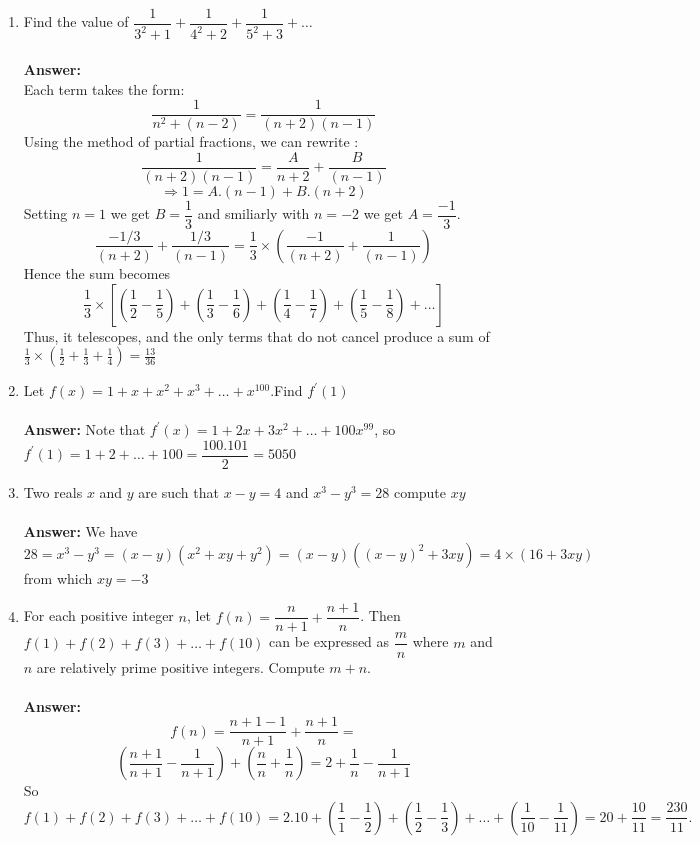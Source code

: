 \documentclass[a4paper]{article}
\begin{document}
\begin{enumerate}
    \item  Find the value of $\dfrac{1}{3^2+1}+
        \dfrac{1}{4^2+2}+\dfrac{1}{5^2+3} + \dots$
        \\ \\
        \textbf{Answer:} \\
        Each term takes the form:
        $$ \dfrac{1}{n^2 + (n-2)} = \dfrac{1}{(n+2)(n-1)}$$
        Using the method of partial fractions, we can rewrite :
        $$ \dfrac{1}{(n+2)(n-1)} = \dfrac{A}{n+2} + \dfrac{B}{(n-1)}$$
        $$ \Rightarrow 1 = A.(n-1) + B.(n+2)$$
        Setting $n=1$ we get $B=\dfrac{1}{3}$ and smiliarly with $n=-2$ we 
        get $A=\dfrac{-1}{3}$. 
        \[
            \dfrac{-1/3}{(n+2)} + \dfrac{1/3}{(n-1)} = \dfrac{1}{3} \times (\dfrac{-1}{(n+2)} + \dfrac{1}{(n-1)})
        \] Hence the sum becomes
        \[
           \displaystyle \frac{1}{3} \times [(\frac{1}{2}-\frac{1}{5}) + (\frac{1}{3}-\frac{1}{6})
           +(\frac{1}{4}-\frac{1}{7}) + (\frac{1}{5} - \frac{1}{8})+  \dots]
        \]
        Thus, it telescopes, and the only terms that do not cancel produce a sum of $\frac{1}{3} \times
        (\frac{1}{2} + \frac{1}{3} + \frac{1}{4}) = \frac{13}{36}$
    \item Let $f(x) = 1 + x + x^2 + x^3 + \dots+ x^{100}$.Find $f^\prime(1)$
        \\ \\
        \textbf{Answer:}
        Note that $f^\prime(x) = 1 + 2x + 3x^2 + \dots + 100x^{99}
        $, so $f^\prime(1) = 1+2+\dots+100 = \dfrac{100.101}{2} = 5050$
    \item Two reals $x$ and $y$ are such that $x - y = 4$ and $x^3 - y^3 = 28$ compute $xy$ 
        \\ \\
        \textbf{Answer:}
        We have $$28 = x^3 -y^3 = (x-y)(x^2 + xy + y^2) = (x-y)((x-y)^2 + 3xy) = 4 \times(16 + 3xy)$$
        from which $xy = -3$
    \item  For each positive integer $n$, let $f(n) = \dfrac{n}{n+1} + \dfrac{n+1}{n}$. Then $f (1) + f (2) + f (3) + 
    \dots + f (10)$ can be expressed as $\dfrac{m}{n}$ where $m$ and $n$ are relatively prime positive integers. Compute $m + n$.
        \\ \\
        \textbf{Answer:}
        \[
            f(n) = \frac{n+1-1}{n+1} + \frac{n+1}{n} = 
        \]
        \[
            (\frac{n+1}{n+1} - \frac{1}{n+1}) + (\frac{n}{n} + \frac{1}{n}) = 2 + \frac{1}{n}
             - \frac{1}{n+1}
        \]
        So 
        \[
            f(1) + f(2) + f(3) + \dots + f(10) = 2.10  + (\frac{1}{1} - \frac{1}{2}) + (\frac{1}{2} - \frac{1}{3}) + \dots
             + (\frac{1}{10} - \frac{1}{11}) = 20 + \frac{10}{11} =  \frac{230}{11}.
        \]
\end{enumerate}
\end{document}
